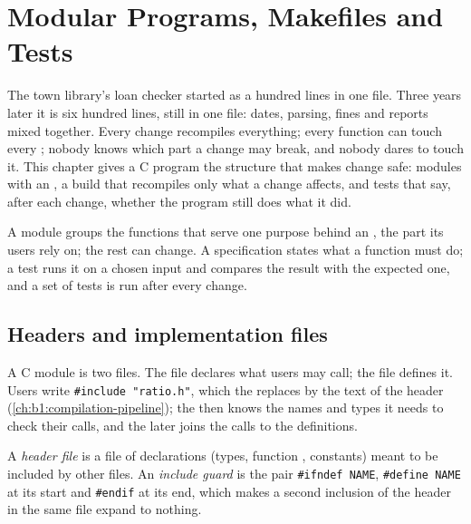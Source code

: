 \chapter{Modular Programs, Makefiles and Tests}\label{ch:b1:c-modules-make-tests}

The town library's loan checker started as a hundred lines in one file. Three years later it is six hundred lines,
still in one file: dates, parsing, fines and reports mixed together. Every change recompiles everything; every
function can touch every ; nobody knows which part a change may break, and nobody dares to touch
it. This chapter gives a C program the structure that makes change safe: modules with an , a build that
recompiles only what a change affects, and tests that say, after each change, whether the program still does what
it did.

\begin{recall}
A module groups the functions that serve one purpose behind an , the part its users rely on; the rest
can change. A specification states what a function must do; a test runs it on a chosen input and compares the result
with the expected one, and a set of tests is run after every change.
\end{recall}

\section{Headers and implementation files}\label{sec:b1:c-modules-make-tests:headers}

A C module is two files. The  file declares what users may call; the  file defines it. Users
write \texttt{\#include "ratio.h"}, which the  replaces by the text of the header
(\cref{ch:b1:compilation-pipeline}); the  then knows the names and types it needs to check their calls, and the
 later joins the calls to the definitions.

\begin{definition}\label{def:b1:c-modules-make-tests:header}
A \emph{header file} is a file of declarations (types, function , constants) meant to be
included by other files. An \emph{include guard} is the pair \texttt{\#ifndef NAME},
\texttt{\#define NAME} at its start and \texttt{\#endif} at its end, which makes a second inclusion of the header in the same
file expand to nothing.
\end{definition}

